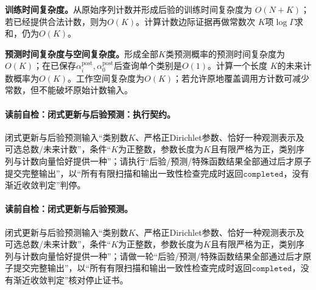 \label{struct:V5-C05-CH26}
\textbf{训练时间复杂度。}从原始序列计数并形成后验的训练时间复杂度为
$O(N+K)$；若已经提供合法计数，则为$O(K)$。计算计数边际证据再做常数次
$K$项$\log\Gamma$求和，仍为$O(K)$。

\label{struct:V5-C05-CH27}
\textbf{预测时间复杂度与空间复杂度。}形成全部$K$类预测概率的预测时间复杂度为
$O(K)$；在已保存$\alpha_i^{\mathrm{post}},\alpha_0^{\mathrm{post}}$后查询单个类别是$O(1)$。计算一个长度
$K$的未来计数概率为$O(K)$。工作空间复杂度为$O(K)$；若允许原地覆盖调用方计数可减少常数，但不能破坏原始计数输入。

\begingroup
\SetAlgoLined
\paragraph{读前自检：闭式更新与后验预测：执行契约。}闭式更新与后验预测输入“类别数$K$、严格正Dirichlet参数、恰好一种观测表示及可选总数/未来计数”，条件“$K$为正整数，参数长度为$K$且有限严格为正，类别序列与计数向量恰好提供一种”；请执行“后验/预测/特殊函数结果全部通过后才原子提交完整输出”，以“所有有限扫描和输出一致性检查完成时返回$\mathtt{completed}$，没有渐近收敛判定”判停。\par
\paragraph{读前自检：闭式更新与后验预测。}闭式更新与后验预测输入“类别数$K$、严格正Dirichlet参数、恰好一种观测表示及可选总数/未来计数”，条件“$K$为正整数，参数长度为$K$且有限严格为正，类别序列与计数向量恰好提供一种”；请做一轮“后验/预测/特殊函数结果全部通过后才原子提交完整输出”，以“所有有限扫描和输出一致性检查完成时返回$\mathtt{completed}$，没有渐近收敛判定”核对停止证书。\par

